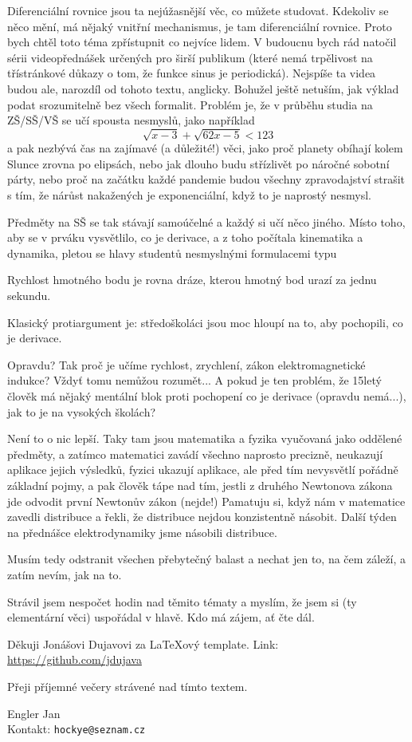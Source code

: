 Diferenciální rovnice jsou ta nejúžasnější věc, co můžete studovat. Kdekoliv se něco mění, má nějaký vnitřní mechanismus, je tam diferenciální rovnice. Proto bych chtěl toto téma zpřístupnit co nejvíce lidem. V budoucnu bych rád natočil sérii videopřednášek určených pro širší publikum (které nemá trpělivost na třístránkové důkazy o tom, že funkce sinus je periodická). Nejspíše ta videa budou ale, narozdíl od tohoto textu, anglicky. Bohužel ještě netuším, jak výklad podat srozumitelně bez všech formalit. Problém je, že v průběhu studia na ZŠ/SŠ/VŠ se učí spousta nesmyslů, jako například 
\begin{equation*}
  \sqrt{x-3}+\sqrt{62x-5}<123
\end{equation*}
a pak nezbývá čas na zajímavé (a důležité!) věci, jako proč planety obíhají kolem Slunce zrovna po elipsách, nebo jak dlouho budu střízlivět po náročné sobotní párty, nebo proč na začátku každé pandemie budou všechny zpravodajství strašit s tím, že nárůst nakažených je exponenciální, když to je naprostý nesmysl.

Předměty na SŠ se tak stávají samoúčelné a každý si učí něco jiného. Místo toho, aby se v prváku vysvětlilo, co je derivace, a z toho počítala kinematika a dynamika, pletou se hlavy studentů nesmyslnými formulacemi typu
\begin{center}
  Rychlost hmotného bodu je rovna dráze, kterou hmotný bod urazí za jednu sekundu.
\end{center}

Klasický protiargument je: středoškoláci jsou moc hloupí na to, aby pochopili, co je derivace. 

Opravdu? Tak proč je učíme rychlost, zrychlení, zákon elektromagnetické indukce? Vždyť tomu nemůžou rozumět... A pokud je ten problém, že 15letý člověk má nějaký mentální blok proti pochopení co je derivace (opravdu nemá...), jak to je na vysokých školách?

Není to o nic lepší. Taky tam jsou matematika a fyzika vyučovaná jako oddělené předměty, a zatímco matematici zavádí všechno naprosto precizně, neukazují aplikace jejich výsledků, fyzici ukazují aplikace, ale před tím nevysvětlí pořádně základní pojmy, a pak člověk tápe nad tím, jestli z druhého Newtonova zákona jde odvodit první Newtonův zákon (nejde!) Pamatuju si, když nám v matematice zavedli distribuce a řekli, že distribuce nejdou konzistentně násobit. Další týden na přednášce elektrodynamiky jsme násobili distribuce.

Musím tedy odstranit všechen přebytečný balast a nechat jen to, na čem záleží, a zatím nevím, jak na to.

Strávil jsem nespočet hodin nad těmito tématy a myslím, že jsem si (ty elementární věci) uspořádal v hlavě. Kdo má zájem, ať čte dál.

Děkuji Jonášovi Dujavovi za \LaTeX ový template. Link: \href{https://github.com/jdujava}{https://github.com/jdujava}

Přeji příjemné večery strávené nad tímto textem.
\begin{flushright}
Engler Jan\\
Kontakt: \texttt{hockye@seznam.cz}
\end{flushright}
